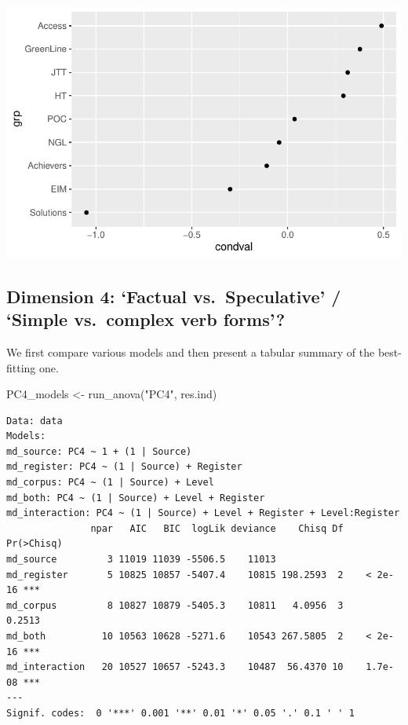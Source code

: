 \documentclass[
  letterpaper,
  DIV=11,
  numbers=noendperiod]{scrreprt}
\newenvironment{Shaded}{\begin{snugshade}}{\end{snugshade}}
\newcommand{\FunctionTok}[1]{\textcolor[rgb]{0.28,0.35,0.67}{#1}}
\newcommand{\NormalTok}[1]{\textcolor[rgb]{0.00,0.23,0.31}{#1}}
\newcommand{\OtherTok}[1]{\textcolor[rgb]{0.00,0.23,0.31}{#1}}
\newcommand{\StringTok}[1]{\textcolor[rgb]{0.13,0.47,0.30}{#1}}
\begin{document}
\includegraphics{AppendixH_files/figure-pdf/unnamed-chunk-17-2.pdf}

\subsection{Dimension 4: `Factual vs.~Speculative' / `Simple vs.~complex
verb
forms'?}\label{dimension-4-factual-vs.-speculative-simple-vs.-complex-verb-forms}

We first compare various models and then present a tabular summary of
the best-fitting one.

\begin{Shaded}
\begin{Highlighting}[]
\NormalTok{PC4\_models }\OtherTok{\textless{}{-}} \FunctionTok{run\_anova}\NormalTok{(}\StringTok{"PC4"}\NormalTok{, res.ind)}
\end{Highlighting}
\end{Shaded}

\begin{verbatim}
Data: data
Models:
md_source: PC4 ~ 1 + (1 | Source)
md_register: PC4 ~ (1 | Source) + Register
md_corpus: PC4 ~ (1 | Source) + Level
md_both: PC4 ~ (1 | Source) + Level + Register
md_interaction: PC4 ~ (1 | Source) + Level + Register + Level:Register
               npar   AIC   BIC  logLik deviance    Chisq Df Pr(>Chisq)    
md_source         3 11019 11039 -5506.5    11013                           
md_register       5 10825 10857 -5407.4    10815 198.2593  2    < 2e-16 ***
md_corpus         8 10827 10879 -5405.3    10811   4.0956  3     0.2513    
md_both          10 10563 10628 -5271.6    10543 267.5805  2    < 2e-16 ***
md_interaction   20 10527 10657 -5243.3    10487  56.4370 10    1.7e-08 ***
---
Signif. codes:  0 '***' 0.001 '**' 0.01 '*' 0.05 '.' 0.1 ' ' 1
\end{verbatim}
\end{document}
